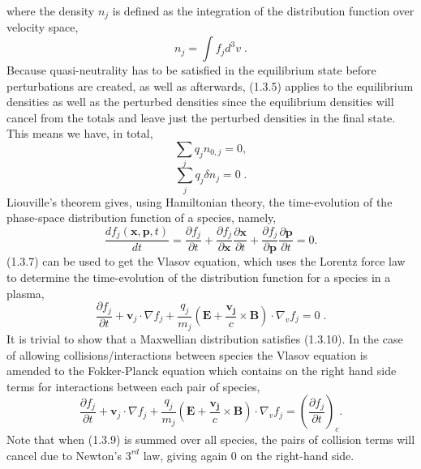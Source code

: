 \documentclass[12pt]{article}
\numberwithin{equation}{subsection}
\begin{document}
where the density $n_j$ is defined as the integration of the distribution function over velocity space,
   \begin{equation}
      n_j = \int f_j d^{3}v\;.
   \end{equation}
Because quasi-neutrality has to be satisfied in the equilibrium state before perturbations are created, as well as
afterwards, (1.3.5) applies to the equilibrium densities as well as the perturbed densities since the equilibrium
densities will cancel from the totals and leave just the perturbed densities in the final state. This means we have,
in total,
   \begin{equation}
      \sum\limits_{j}q_jn_{0,j} = 0,
   \end{equation}
   \begin{equation}
      \sum\limits_{j}q_j\delta n_j = 0\;.
   \end{equation}
   \quad Liouville's theorem gives, using Hamiltonian theory, the time-evolution of the phase-space distribution function of a species,
namely\cite{WessonC},
   \begin{equation}
      \frac{df_j(\bm{x},\bm{p},t)}{dt} = \frac{\partial f_j}{\partial t}
                                       + \frac{\partial f_j}{\partial \bm{x}}\frac{\partial \bm{x}}{\partial t}
                                       + \frac{\partial f_j}{\partial \bm{p}}\frac{\partial \bm{p}}{\partial t} = 0.                     
   \end{equation}
(1.3.7) can be used to get the Vlasov equation\cite{WessonC}, which uses the Lorentz force law to determine the time-evolution
of the distribution function for a species in a plasma,
   \begin{equation}
      \frac{\partial f_j}{\partial t} + \bm{v}_j\cdot\nabla f_j + \frac{q_j}{m_j}(\bm{E} + \frac{\bm{v_j}}{c}\times\bm{B})\cdot\nabla_v f_j = 0\;.
   \end{equation}
It is trivial to show that a Maxwellian distribution satisfies (1.3.10). In the case of allowing collisions/interactions between species the
Vlasov equation is amended to the Fokker-Planck equation which contains on the right hand side terms for interactions between each pair of species\cite{WessonC},
   \begin{equation}
      \frac{\partial f_j}{\partial t} + \bm{v}_j\cdot\nabla f_j
      + \frac{q_j}{m_j}(\bm{E} + \frac{\bm{v_j}}{c}\times\bm{B})\cdot\nabla_v f_j = \left(\frac{\partial f_j}{\partial t}\right)_c.
   \end{equation}
Note that when (1.3.9) is summed over all species, the pairs of collision terms will cancel due to Newton's $3^{rd}$ law,
giving again $0$ on the right-hand side.
\end{document}
